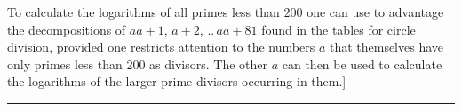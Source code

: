 To calculate the logarithms of all primes less than $200$ one can use to advantage the decompositions of $aa+1$, $a+2$, $..\,aa+81$ found in the tables for circle division, provided one restricts attention to the numbers $a$ that themselves have only primes less than $200$ as divisors. The other $a$ can then be used to calculate the logarithms of the larger prime divisors occurring in them.]
\par\nobreak\smallskip\noindent\hfill\rule{.32\textwidth}{.3pt}\hfill\mbox{}\par
